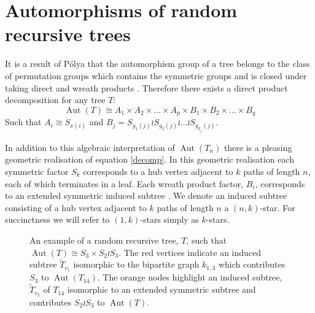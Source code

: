 \documentclass[oneside]{book} %
\theoremstyle{definition}
\numberwithin{equation}{section}
\DeclareMathOperator{\Aut}{Aut} %
\begin{document}
\section{Automorphisms of random recursive trees}\label{sec:aorrt}
 It is a result of P\'{o}lya that the automorphism group of a tree belongs to the class of permutation groups which contains the symmetric groups and is closed under taking direct and wreath products \cite{biggs:1993}. Therefore there exists a direct product decomposition for any tree $T$:
 \begin{equation}\label{decomp}
  \Aut(T) \cong A_{1} \times A_{2} \times\dots\times A_{p} \times B_{1} \times B_{2} \times \dots \times B_{q}
 \end{equation}
Such that $A_{i} \cong S_{x(i)}$ and $B_{j} = S_{y_{1}(j)} \wr S_{y_{2}(j)} \wr \dots \wr S_{y_{k_{j}}(j)}$.

In addition to this algebraic interpretation of $\Aut(T_{n})$ there is a pleasing geometric realisation of equation \ref{decomp}.  In this geometric realisation each symmetric factor $S_k$ corresponds to a hub vertex adjacent to $k$ paths of length $n$, each of which terminates in a leaf. Each wreath product factor, $B_{i}$, corresponds to an extended symmetric induced subtree \cite{Ben}. We denote an induced subtree consisting of a hub vertex adjacent to $k$ paths of length $n$ a $(n,k)$-star.  For succinctness we will refer to $(1,k)$-stars simply as $k$-stars.

\begin{figure}[ht]
\centering
{}
\caption{An example of a random recursive tree, $T$, such that $\Aut(T) \cong S_{3} \times S_{2}\wr S_{3}$.  
The red vertices indicate an induced subtree $\tilde{T}_{v_{1}}$ isomorphic to the bipartite graph $k_{1,3}$ which 
contributes $S_{3}$ to $\Aut(T_{14})$. The orange nodes highlight an induced subtree, $\tilde{T}_{v_{2}}$ of $T_{14}$ 
isomorphic to an extended symmetric subtree and contributes $S_{2}\wr S_{3}$ to $\Aut(T)$.}\label{fig2}
\end{figure}
\end{document}
